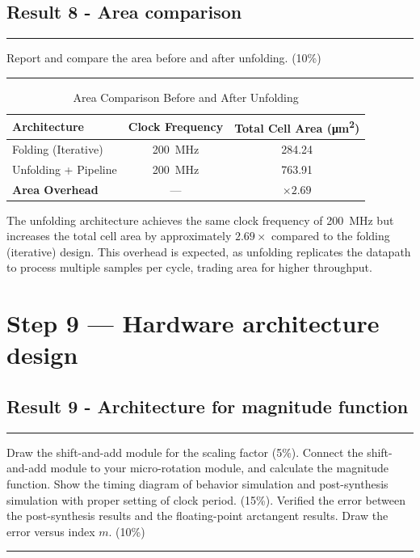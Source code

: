 \documentclass[12pt,a4paper]{report}
\begin{document}
\section{Result 8 - Area comparison}

\hrule
\vspace{0.2cm}
Report and compare the area before and after unfolding. (10\%)
\vspace{0.2cm}
\hrule
\vspace{0.2cm}

\begin{table}[H]
\centering
\caption{Area Comparison Before and After Unfolding}
\vspace{0.6em}
\setlength{\tabcolsep}{16pt}
\renewcommand{\arraystretch}{1.35}
\begin{tabular}{lcc}
\toprule
\textbf{Architecture} & \textbf{Clock Frequency} & \textbf{Total Cell Area (\si{\micro\metre\squared})} \\
\midrule
Folding (Iterative)       & \SI{200}{MHz} & 284.24 \\
Unfolding + Pipeline      & \SI{200}{MHz} & 763.91 \\
\midrule
\textbf{Area Overhead}    & ---           & $\mathbf{\times 2.69}$ \\
\bottomrule
\end{tabular}
\end{table}

The unfolding architecture achieves the same clock frequency of \SI{200}{MHz} but increases the total cell area by approximately $2.69\times$ compared to the folding (iterative) design. This overhead is expected, as unfolding replicates the datapath to process multiple samples per cycle, trading area for higher throughput.

\newpage

\chapter{Step 9 — Hardware architecture design}
\section{Result 9 - Architecture for magnitude function}

\hrule
\vspace{0.2cm}
Draw the shift-and-add module for the scaling factor (5\%). Connect the shift-and-add module to your micro-rotation module, and calculate the magnitude function. Show the timing diagram of behavior simulation and post-synthesis simulation with proper setting of clock period. (15\%). Verified the error between the post-synthesis results and the floating-point arctangent results. Draw the error versus index $m$. (10\%)
\vspace{0.2cm}
\hrule
\vspace{0.2cm}
\end{document}
